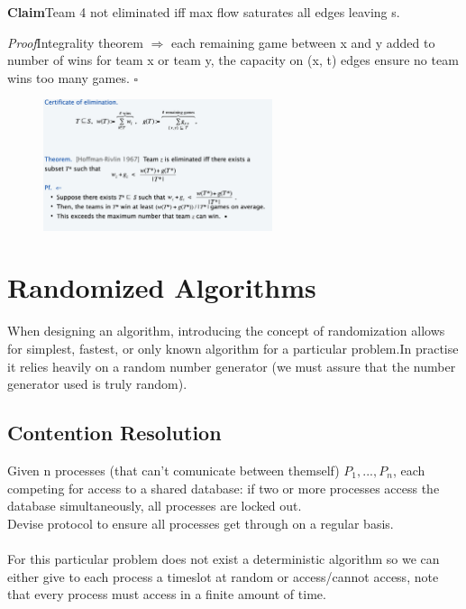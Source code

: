 \documentclass[11pt]{article}
\newenvironment{claim}[1]{\par\textbf{Claim}\space#1}{}
\newenvironment{proof}[1]{\par\textit{Proof}\space#1}{\hfill\ensuremath{\square}}
\begin{document}
\begin{claim}
Team 4 not eliminated iff max flow saturates all edges leaving s.
\end{claim}\\

\begin{proof}
Integrality theorem $\Rightarrow $ each remaining game between x and y added to number of wins for team x or team y, the capacity on (x, t) edges ensure no team wins too many games.
\end{proof}

\begin{figure}[H]
		\centering
		\includegraphics[width=0.6\textwidth ]{baseballElimination}
\end{figure}

\clearpage

\section{Randomized Algorithms}
When designing an algorithm, introducing the concept of randomization allows for simplest, fastest, or only known algorithm for a particular problem.In practise it relies heavily on a random number generator (we must assure that the number generator used is truly random).

\subsection{Contention Resolution}

Given n processes (that can't comunicate between themself) $P_{1}, ..., P_{n}$, each competing for access to a shared database: if two or more processes access the database simultaneously, all processes are locked out.\\ Devise protocol to ensure all processes get through on a regular basis.\\\\
For this particular problem does not exist a deterministic algorithm so we can either give to each process a timeslot at random or access/cannot access, note that every process must access in a finite amount of time.
\end{document}
